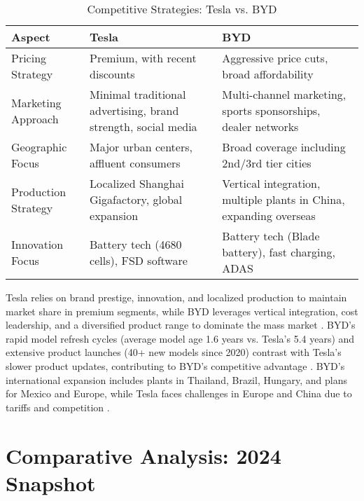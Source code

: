 \documentclass{article}
\begin{document}
\begin{table}[ht]
\centering
\caption{Competitive Strategies: Tesla vs. BYD}
\label{tab:strategies}
\begin{tabularx}{\textwidth}{l X X}
\toprule
Aspect & Tesla & BYD \\
\midrule
Pricing Strategy & Premium, with recent discounts & Aggressive price cuts, broad affordability \\
Marketing Approach & Minimal traditional advertising, brand strength, social media & Multi-channel marketing, sports sponsorships, dealer networks \\
Geographic Focus & Major urban centers, affluent consumers & Broad coverage including 2nd/3rd tier cities \\
Production Strategy & Localized Shanghai Gigafactory, global expansion & Vertical integration, multiple plants in China, expanding overseas \\
Innovation Focus & Battery tech (4680 cells), FSD software & Battery tech (Blade battery), fast charging, ADAS \\
\bottomrule
\end{tabularx}
\end{table}

Tesla relies on brand prestige, innovation, and localized production to maintain market share in premium segments, while BYD leverages vertical integration, cost leadership, and a diversified product range to dominate the mass market \citep{daxue2024,aeternus2024}. BYD's rapid model refresh cycles (average model age 1.6 years vs. Tesla's 5.4 years) and extensive product launches (40+ new models since 2020) contrast with Tesla's slower product updates, contributing to BYD's competitive advantage \citep{reuters2025}. BYD's international expansion includes plants in Thailand, Brazil, Hungary, and plans for Mexico and Europe, while Tesla faces challenges in Europe and China due to tariffs and competition \citep{investors2024,jato2024}.

\section{Comparative Analysis: 2024 Snapshot}
\end{document}
